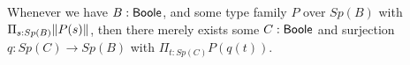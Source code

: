 
\begin{axiomNum}\label{AxLocalChoice}
  Whenever we have $B:\mathsf{Boole}$, and some type family $P$ over $Sp(B)$ with 
  $\Pi_{s:Sp(B)} \lVert P(s) \rVert$, then there 
  merely exists some $C:\mathsf{Boole}$ and surjection $q:Sp(C)\to Sp(B)$ with 
$  \Pi_{t:Sp(C)} P(q(t))$.
\end{axiomNum}


